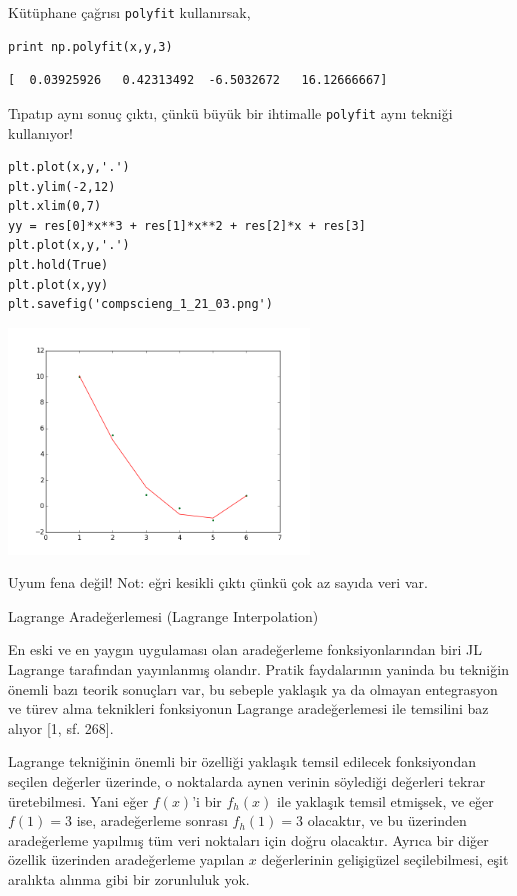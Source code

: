 \documentclass[12pt,fleqn]{article}\usepackage{../../common}
\begin{document}
Kütüphane çağrısı \verb!polyfit! kullanırsak,

\begin{verbatim}
print np.polyfit(x,y,3)
\end{verbatim}

\begin{verbatim}
[  0.03925926   0.42313492  -6.5032672   16.12666667]
\end{verbatim}

Tıpatıp aynı sonuç çıktı, çünkü büyük bir ihtimalle \verb!polyfit! aynı
tekniği kullanıyor! 

\begin{verbatim}
plt.plot(x,y,'.')
plt.ylim(-2,12)
plt.xlim(0,7)
yy = res[0]*x**3 + res[1]*x**2 + res[2]*x + res[3]
plt.plot(x,y,'.')
plt.hold(True)
plt.plot(x,yy)
plt.savefig('compscieng_1_21_03.png')
\end{verbatim}

\includegraphics[height=6cm]{compscieng_1_21_03.png}

Uyum fena değil! Not: eğri kesikli çıktı çünkü çok az sayıda veri var. 


Lagrange Aradeğerlemesi (Lagrange Interpolation)

En eski ve en yaygın uygulaması olan aradeğerleme fonksiyonlarından biri JL
Lagrange tarafından yayınlanmış olandır. Pratik faydalarının yaninda bu tekniğin
önemli bazı teorik sonuçları var, bu sebeple yaklaşık ya da olmayan entegrasyon
ve türev alma teknikleri fonksiyonun Lagrange aradeğerlemesi ile temsilini baz
alıyor [1, sf. 268].

Lagrange tekniğinin önemli bir özelliği yaklaşık temsil edilecek fonksiyondan
seçilen değerler üzerinde, o noktalarda aynen verinin söylediği değerleri tekrar
üretebilmesi. Yani eğer $f(x)$'i bir $f_h(x)$ ile yaklaşık temsil etmişsek, ve
eğer $f(1) = 3$ ise, aradeğerleme sonrası $f_h(1) = 3$ olacaktır, ve bu
üzerinden aradeğerleme yapılmış tüm veri noktaları için doğru olacaktır. Ayrıca
bir diğer özellik üzerinden aradeğerleme yapılan $x$ değerlerinin gelişigüzel
seçilebilmesi, eşit aralıkta alınma gibi bir zorunluluk yok.
\end{document}
